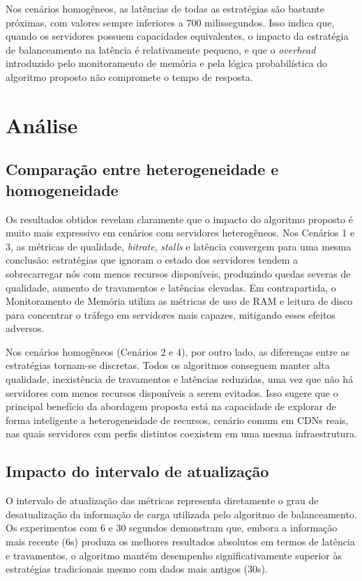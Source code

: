 Nos cenários homogêneos, as latências de todas as estratégias são bastante próximas, com valores sempre inferiores a 700 milissegundos. Isso indica que, quando os servidores possuem capacidades equivalentes, o impacto da estratégia de balanceamento na latência é relativamente pequeno, e que o \textit{overhead} introduzido pelo monitoramento de memória e pela lógica probabilística do algoritmo proposto não compromete o tempo de resposta.

\section{Análise}

\subsection{Comparação entre heterogeneidade e homogeneidade}

Os resultados obtidos revelam claramente que o impacto do algoritmo proposto é muito mais expressivo em cenários com servidores heterogêneos. Nos Cenários 1 e 3, as métricas de qualidade, \textit{bitrate}, \textit{stalls} e latência convergem para uma mesma conclusão: estratégias que ignoram o estado dos servidores tendem a sobrecarregar nós com menos recursos disponíveis, produzindo quedas severas de qualidade, aumento de travamentos e latências elevadas. Em contrapartida, o Monitoramento de Memória utiliza as métricas de uso de RAM e leitura de disco para concentrar o tráfego em servidores mais capazes, mitigando esses efeitos adversos.

Nos cenários homogêneos (Cenários 2 e 4), por outro lado, as diferenças entre as estratégias tornam-se discretas. Todos os algoritmos conseguem manter alta qualidade, inexistência de travamentos e latências reduzidas, uma vez que não há servidores com menos recursos disponíveis a serem evitados. Isso sugere que o principal benefício da abordagem proposta está na capacidade de explorar de forma inteligente a heterogeneidade de recursos, cenário comum em CDNs reais, nas quais servidores com perfis distintos coexistem em uma mesma infraestrutura.

\subsection{Impacto do intervalo de atualização}

O intervalo de atualização das métricas representa diretamente o grau de desatualização da informação de carga utilizada pelo algoritmo de balanceamento. Os experimentos com 6 e 30 segundos demonstram que, embora a informação mais recente (6s) produza os melhores resultados absolutos em termos de latência e travamentos, o algoritmo mantém desempenho significativamente superior às estratégias tradicionais mesmo com dados mais antigos (30s).

